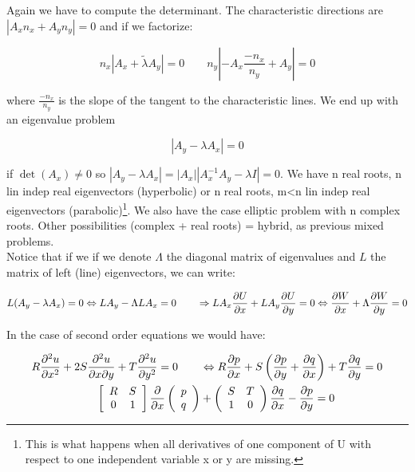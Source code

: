 Again we have to compute the determinant. The characteristic directions are $|A_x n_x + A_y n_y| = 0$ and if we factorize: 

\begin{equation}
n_x |A_x + \tilde{\lambda} A_y| = 0 \qquad n_y \left|-A_x \frac{-n_x}{n_y} + A_y\right| = 0
\end{equation} 

where $\frac{-n_x}{n_y}$ is the slope of the tangent to the characteristic lines. We end up with an eigenvalue problem

\begin{equation}
|A_y - \lambda A_x| = 0
\end{equation}

if $\det (A_x) \neq 0$ so $|A_y - \lambda A_x| = |A_x||A_x^{-1}A_y - \lambda I| = 0$. We have n real roots, n lin indep real eigenvectors (hyperbolic) or n real roots, m<n lin indep real eigenvectors (parabolic)\footnote{This is what happens when all derivatives of one component of U with respect to one independent variable x or y are missing.}. We also have the case elliptic problem with n complex roots. Other possibilities (complex + real roots) = hybrid, as previous mixed problems. \\

Notice that if we if we denote $\Lambda$ the diagonal matrix of eigenvalues and $L$ the matrix of left (line) eigenvectors, we can write: 

\begin{equation}
L(A_y - \lambda A_x) = 0 \Leftrightarrow LA_y - \Lambda LA_x = 0 \qquad \Rightarrow LA_x \frac{\partial U}{\partial x} + LA_y \frac{\partial U}{\partial y} = 0 \Leftrightarrow \frac{\partial W}{\partial x} + \Lambda \frac{\partial W}{\partial y} = 0 
\end{equation}

In the case of second order equations we would have: 

\begin{equation}
\begin{aligned}
R\frac{\partial ^2 u}{\partial x^2} + 2S \frac{\partial ^2 u}{\partial x \partial y} + T\frac{\partial ^2 u}{\partial y^2} = 0 \qquad &\Leftrightarrow R\frac{\partial p}{\partial x}  + S \left(  \frac{\partial p }{\partial y	} + \frac{\partial q}{\partial x}\right) + T\frac{\partial q}{\partial y} = 0\\
\left[
\begin{array}{cc}
R & S\\
0 & 1
\end{array}
\right]
\frac{\partial }{\partial x}\left( 
\begin{array}{c}
p\\
q
\end{array}
\right)
&+ \left( 
\begin{array}{cc}
S & T\\
1 & 0
\end{array}
\right)\frac{\partial q}{\partial x} - \frac{\partial p }{\partial y} = 0
\end{aligned}
\end{equation}


